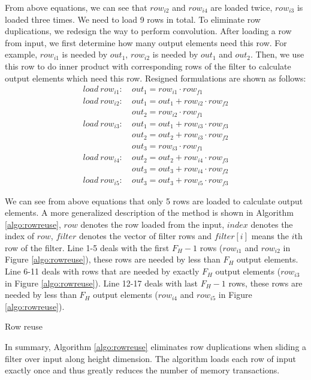 From above equations, we can see that $row_{i2}$ and $row_{i4}$ are loaded twice, $row_{i3}$ is loaded three times. We need to load 9 rows
in total. To eliminate row duplications, we redesign the way to perform convolution. After loading a row from input, we first determine how
many output elements need this row. For example, $row_{i1}$ is needed by $out_1$, $row_{i2}$ is needed by $out_1$ and $out_2$. Then, we use
this row to do inner product with corresponding rows of the filter to calculate output elements which need this row. Resigned formulations
are shown as follows:
\begin{equation}\nonumber
\begin{aligned}
load\ row_{i1}:
&\ out_1=row_{i1} \cdot row_{f1} \\
load\ row_{i2}:
&\ out_1 = out_1+row_{i2} \cdot row_{f2}\\
&\ out_2=row_{i2} \cdot row_{f1}\\
load\ row_{i3}:
&\ out_1 = out_1+row_{i3} \cdot row_{f3}\\
&\ out_2 = out_2+row_{i3} \cdot row_{f2}\\
&\ out_{3}=row_{i3} \cdot row_{f1}\\
load\ row_{i4}:
&\ out_2=out_2+row_{i4} \cdot row_{f3} \\
&\ out_3=out_3+row_{i4} \cdot row_{f2}\\
load\ row_{i5}:
&\ out_3=out_3+row_{i5} \cdot row_{f3}
\end{aligned}	
\end{equation}



We can see from above equations that only 5 rows are loaded to calculate output elements. A more generalized description of the method is
shown in Algorithm \ref{algo:rowreuse}, $row$ denotes the row loaded from the input, $index$ denotes the index of $row$, $filter$ denotes
the vector of filter rows and $filter[i]$ means the $i$th row of the filter. Line 1-5 deals with the first $F_H-1$ rows ($row_{i1}$ and $row_{i2}$ in Figure \ref{algo:rowreuse}), these rows
are needed by less than $F_H$ output elements. Line 6-11 deals with rows that are needed by exactly $F_H$ output elements ($row_{i3}$ in
Figure \ref{algo:rowreuse}). Line 12-17 deals with last $F_H-1$ rows, these rows are needed by less than $F_H$ output elements ($row_{i4}$
and $row_{i5}$ in Figure \ref{algo:rowreuse}).

\begin{algorithm}
	\caption{Row reuse}
	\label{algo:rowreuse}
\end{algorithm}

In summary, Algorithm \ref{algo:rowreuse} eliminates row duplications when sliding a filter over input along height dimension. The
algorithm loads each row of input exactly once and thus greatly reduces the number of memory transactions.
